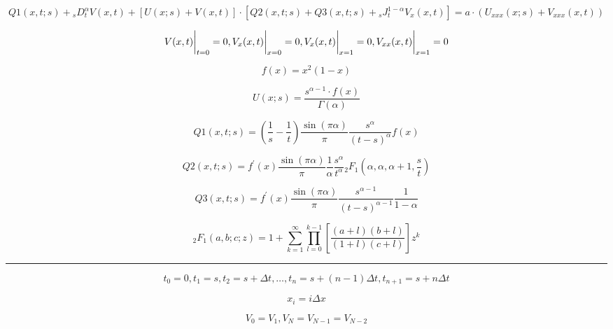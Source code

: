 \documentclass[12pt, a4paper]{article}
\begin{document}
	\begin{dmath}
	Q1(x,t;s) + {}_{s}D_{t}^{\alpha} V(x,t) + [U(x;s) + V(x,t)]\cdot [ Q2(x,t;s) +  Q3(x,t;s) +  {}_{s}J^{1-\alpha}_{t}V_{x}(x,t)]=a \cdot (U_{xxx}(x;s) + V_{xxx}(x,t))
	\end{dmath}
	
	\begin{equation}
	V(x,t) \bigg{|}_{t=0} = 0, V_{x}(x,t) \bigg{|}_{x=0}=0, V_{x}(x,t) \bigg{|}_{x=1}=0, V_{xx}(x,t) \bigg{|}_{x=1}=0
	\end{equation}

	\begin{equation}
	f(x) = x^{2}(1-x)
	\end{equation}

	\begin{equation}
	U(x;s) = \frac{s^{\alpha-1} \cdot f(x)}{\Gamma(\alpha)}
	\end{equation}

	\begin{equation}
	Q1(x,t;s) = \left(\frac{1}{s} - \frac{1}{t}\right) \frac{\sin(\pi \alpha)}{\pi} \frac{s^{\alpha}}{(t-s)^{\alpha}} f(x)
	\end{equation}

	\begin{equation}
	Q2(x,t;s) =  f^{'}(x) \frac{\sin(\pi \alpha)}{\pi} \frac{1}{\alpha} \frac{s^{\alpha}}{t^{\alpha}} {}_{2}F_{1}\left(\alpha, \alpha, \alpha+1, \frac{s}{t}\right)
	\end{equation}
	
	\begin{equation}
	Q3(x,t;s) = f^{'}(x) \frac{\sin(\pi \alpha)}{\pi} \frac{s^{\alpha - 1}}{(t-s)^{\alpha-1}} \frac{1}{1-\alpha}
	\end{equation}
	
	\begin{equation}
	{}_{2}F_{1}(a,b;c;z) = 1+ \sum_{k = 1}^{\infty} \prod_{l=0}^{k-1} \left[ \frac{(a + l)(b + l)}{(1 + l)(c + l)} \right] z^{k}
	\end{equation}

\noindent\rule{\linewidth}{0.4pt}
	\begin{equation}
	t_{0} = 0, t_{1} = s, t_{2} = s + \Delta t, \dots, t_{n} = s + (n - 1)\Delta t, t_{n+1} = s + n\Delta t
	\end{equation}
	
	\begin{equation}
	x_{i} = i \Delta x
	\end{equation}
	
	\begin{equation}
	V_{0} = V_{1}, V_{N} = V_{N-1} = V_{N-2}
	\end{equation}
\end{document}
